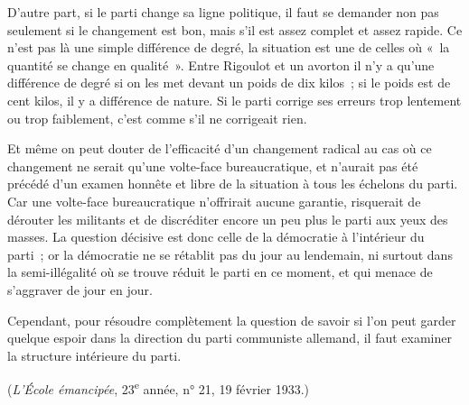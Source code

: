 \documentclass[french,twoside]{book} %
\begin{document}
D'autre part, si le parti change sa ligne politique, il faut se demander non pas seulement si le changement est bon, mais s'il est assez complet et assez rapide. Ce n'est pas là une simple différence de degré, la situation est une de celles où « la quantité se change en qualité ». Entre Rigoulot et un avorton il n'y a qu'une différence de degré si on les met devant un poids de dix kilos ; si le poids est de cent kilos, il y a différence de nature. Si le parti corrige ses erreurs trop lentement ou trop faiblement, c'est comme s'il ne corrigeait rien.\par
Et même on peut douter de l'efficacité d'un changement radical au cas où ce changement ne serait qu'une volte-face bureaucratique, et n'aurait pas été précédé d'un examen honnête et libre de la situation à tous les échelons du parti. Car une volte-face bureaucratique n'offrirait aucune garantie, risquerait de dérouter les militants et de discréditer encore un peu plus le parti aux yeux des masses. La question décisive est donc celle de la démocratie à l'intérieur du parti ; or la démocratie ne se rétablit pas du jour au lendemain, ni surtout dans la semi-illégalité où se trouve réduit le parti en ce moment, et qui menace de s'aggraver de jour en jour.\par
Cependant, pour résoudre complètement la question de savoir si l'on peut garder quelque espoir dans la direction du parti communiste allemand, il faut examiner la structure intérieure du parti.\par
({\itshape L'École émancipée}, 23\textsuperscript{e} année, n° 21, 19 février 1933.)
\end{document}
